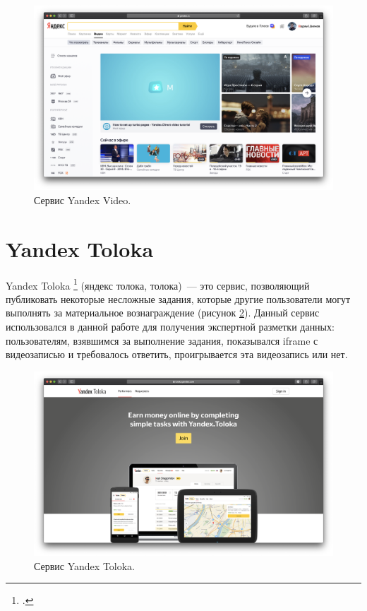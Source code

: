 \begin{figure}
    \centering
    \includegraphics[width=\textwidth]{../images/yandex_video.png}
    \caption{Сервис Yandex Video.}
    \label{fig:yandex_video}
\end{figure}

\section{Yandex Toloka}

Yandex Toloka \footcite{Toloka} (яндекс толока, толока)~--- это сервис, позволяющий публиковать некоторые несложные задания, которые другие пользователи могут выполнять за материальное вознаграждение (рисунок \ref{fig:yandex_toloka}). Данный сервис использовался в данной работе для получения экспертной разметки данных: пользователям, взявшимся за выполнение задания, показывался iframe с видеозаписью и требовалось ответить, проигрывается эта видеозапись или нет.

\begin{figure}
    \centering
    \includegraphics[width=\textwidth]{../images/yandex_toloka.png}
    \caption{Сервис Yandex Toloka.}
    \label{fig:yandex_toloka}
\end{figure}

